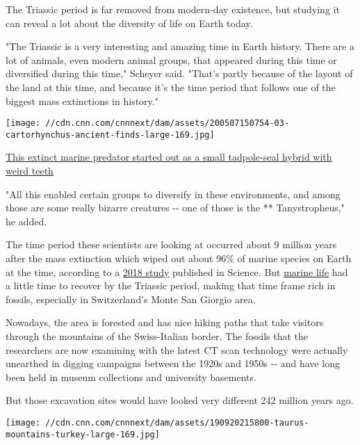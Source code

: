 The Triassic period is far removed from modern-day existence, but
studying it can reveal a lot about the diversity of life on Earth today.

"The Triassic is a very interesting and amazing time in Earth history.
There are a lot of animals, even modern animal groups, that appeared
during this time or diversified during this time," Scheyer said. "That's
partly because of the layout of the land at this time, and because it's
the time period that follows one of the biggest mass extinctions in
history."

\href{/2020/05/08/world/marine-reptile-fossil-pebble-teeth-scn/index.html}{}

\texttt{[image: //cdn.cnn.com/cnnnext/dam/assets/200507150754-03-cartorhynchus-ancient-finds-large-169.jpg]}

\href{/2020/05/08/world/marine-reptile-fossil-pebble-teeth-scn/index.html}{This
extinct marine predator started out as a small tadpole-seal hybrid with
weird teeth}

"All this enabled certain groups to diversify in these environments, and
among those are some really bizarre creatures -\/- one of those is the
** Tanystropheus," he added.

The time period these scientists are looking at occurred about 9 million
years after the mass extinction which wiped out about 96\% of marine
species on Earth at the time, according to a
\href{https://earth.stanford.edu/news/what-caused-earths-biggest-mass-extinction\#gs.cou6am}{2018
study} published in Science. But
\href{https://www.cnn.com/2020/05/08/world/marine-reptile-fossil-pebble-teeth-scn/index.html}{marine
life} had a little time to recover by the Triassic period, making that
time frame rich in fossils, especially in Switzerland's Monte San
Giorgio area.

Nowadays, the area is forested and has nice hiking paths that take
visitors through the mountains of the Swiss-Italian border. The fossils
that the researchers are now examining with the latest CT scan
technology were actually unearthed in digging campaigns between the
1920s and 1950s -\/- and have long been held in museum collections and
university basements.

But those excavation sites would have looked very different 242 million
years ago.

\href{/2019/09/23/world/lost-continent-europe-scn-trnd/index.html}{}

\texttt{[image: //cdn.cnn.com/cnnnext/dam/assets/190920215800-taurus-mountains-turkey-large-169.jpg]}

